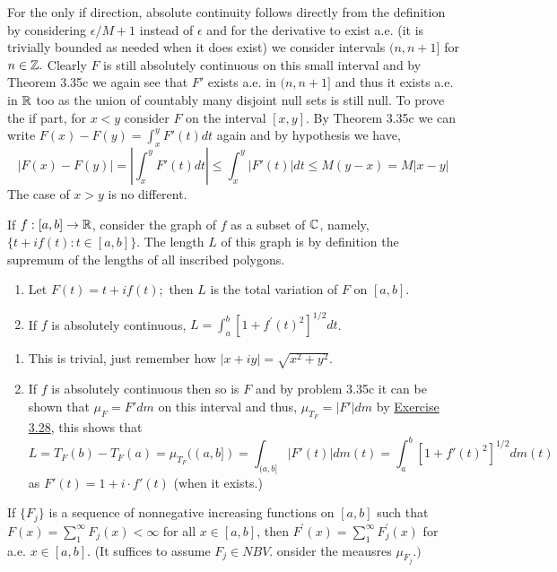 \documentclass[12pt,a4paper]{article}
\begin{document}
\begin{solution}
    For the only if direction, absolute continuity follows directly from the definition by considering $\epsilon/{M+1}$ instead of $\epsilon$ and for the derivative to exist a.e. (it is trivially bounded as needed when it does exist) we consider intervals $(n,n+1]$ for $n\in\mathbb{Z}.$ 
    Clearly $F$ is still absolutely continuous on this small interval and by Theorem 3.35c we again see that $F'$ exists a.e. in $(n,n+1]$ and thus it exists a.e. in $\mathbb{R}$ too as the union of countably many disjoint null sets is still null.
    To prove the if part, for $x<y$ consider $F$ on the interval $[x,y].$ 
    By Theorem 3.35c we can write $F(x)-F(y)=\int_x^yF'(t)dt$ again and by hypothesis we have,
    \[
        |F(x)-F(y)|=\left|\int_x^yF'(t)dt\right|\leq\int_x^y|F'(t)|dt\leq M(y-x)=M|x-y|
    \]
    The case of $x>y$ is no different.
\end{solution}
\begin{problem}\label{prob:3-38}
If $f:[a,b]\rightarrow\mathbb{R}$, consider the graph of $f$ as a subset of $\mathbb{C}$, namely, $\{t+if(t): t\in[a,b]\}$. The length $L$ of this graph is by definition the supremum of the lengths of all inscribed polygons.
\begin{enumerate}[label=\alph*.]
    \item Let $F(t)=t+if(t);$ then $L$ is the total variation of $F$ on $[a, b]$.
    \item If $f$ is absolutely continuous, $L=\int_{a}^{b}[1+f^{\prime}(t)^{2}]^{1/2}dt$.
\end{enumerate}
\end{problem}
\begin{solution}
\begin{enumerate}[label=\alph*.]
    \item This is trivial, just remember how $|x+iy|=\sqrt{x^2+y^2}.$
    \item If $f$ is absolutely continuous then so is $F$ and by problem 3.35c it can be shown that $\mu_F= F'dm$ on this interval and thus, $\mu_{T_F}=|F'|dm$ by \hyperref[prob:3-28]{Exercise 3.28}, this shows that
        \[
            L=T_F(b)-T_F(a)=\mu_{T_F}((a,b])=\int_{(a,b]}|F'(t)|dm(t)=\int_a^b[1+f'(t)^2]^{1/2}dm(t)
        \]
        as $F'(t)=1+i\cdot f'(t)$ (when it exists.)
\end{enumerate}
\end{solution}
\begin{problem}\label{prob:3-39}
    If $\{F_{j}\}$ is a sequence of nonnegative increasing functions on $[a, b]$ such that $F(x)=\sum_{1}^{\infty}F_{j}(x)<\infty$ for all $x\in[a,b]$, then $F^{\prime}(x)=\sum_{1}^{\infty}F_{j}^{\prime}(x)$ for a.e. $x\in[a,b]$. (It suffices to assume $F_j\in NBV$. onsider the meausres $\mu_{F_j}.)$
\end{problem}
\end{document}
